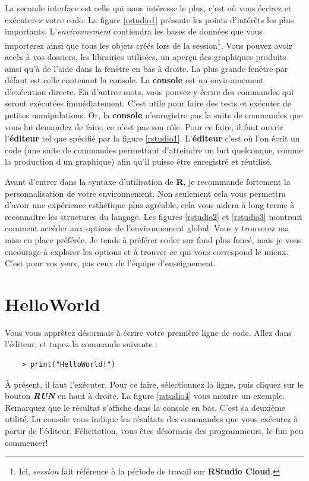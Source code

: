 \documentclass[10.5pt,a4paper]{article}
\begin{document}
\vspace{1cm}

La seconde interface est celle qui nous intéresse le plus, c'est où vous écrirez et exécuterez votre code. La figure \ref{rstudio1} présente les points d'intérêts les plus importants. L'\emph{environnement} contiendra les bases de données que vous importerez ainsi que tous les objets créés lors de la session\footnote{Ici, \emph{session} fait référence à la période de travail sur \textbf{RStudio Cloud}.}. Vous pouvez avoir accès à vos dossiers, les librairies utilisées, un aperçu des graphiques produits ainsi qu'à de l'aide dans la fenêtre en bas à droite. La plus grande fenêtre par défaut est celle contenant la console. La \textbf{console} est un environnement d'exécution directe. En d'autres mots, vous pouvez y écrire des commandes qui seront exécutées immédiatement. C'est utile pour faire des tests et exécuter de petites manipulations. Or, la \textbf{console} n'enregistre pas la suite de commandes que vous lui demandez de faire, ce n'est pas son rôle. Pour ce faire, il faut ouvrir l'\textbf{éditeur} tel que spécifié par la figure \ref{rstudio1}. L'\textbf{éditeur} c'est où l'on écrit un code (une suite de commandes permettant d'atteindre un but quelconque, comme la production d'un graphique) afin qu'il puisse être enregistré et réutilisé.  
  
  Avant d'entrer dans la syntaxe d'utilisation de \textbf{R}, je recommande fortement la personnalisation de votre environnement. Non seulement cela vous permettra d'avoir une expérience esthétique plus agréable, cela vous aidera à long terme à reconnaître les structures du langage. Les figures \ref{rstudio2} et \ref{rstudio3} montrent comment accéder aux options de l'environnement global. Vous y trouverez ma mise en place préférée. Je tends à préférer coder sur fond plus foncé, mais je vous encourage à explorer les options et à trouver ce qui vous correspond le mieux. C'est pour vos yeux, pas ceux de l'équipe d'enseignement. 


\section{HelloWorld}

Vous vous apprêtez désormais à écrire votre première ligne de code. Allez dans l'éditeur, et tapez la commande suivante :
    \begin{lstlisting}
    > print("HelloWorld!")
    \end{lstlisting}
À présent, il faut l'exécuter. Pour ce faire, sélectionnez la ligne, puis cliquez sur le bouton \textit{\textbf{RUN}} en haut à droite. La figure \ref{rstudio4} vous montre un exemple. Remarquez que le résultat s'affiche dans la console en bas. C'est sa deuxième utilité. La console vous indique les résultats des commandes que vous exécutez à partir de l'éditeur. Félicitation, vous êtes désormais des programmeurs, le fun peu commencer! 
\end{document}
